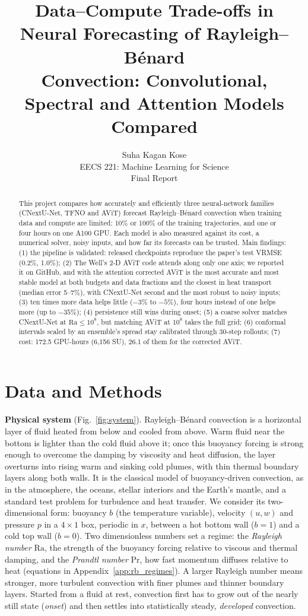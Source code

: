 \documentclass[11pt]{article}
\title{Data--Compute Trade-offs in Neural Forecasting of Rayleigh--B\'enard \\
  Convection: Convolutional, Spectral and Attention Models Compared}
\author{Suha Kagan Kose \\
  EECS 221: Machine Learning for Science \\
  Final Report}
\begin{document}
\maketitle

\begin{abstract}
This project compares how accurately and efficiently three neural-network families (CNextU-Net, TFNO and AViT)
forecast Rayleigh--B\'enard convection when training data and compute are limited: 10\% or 100\% of the training
trajectories, and one or four hours on one A100 GPU. Each model is also measured against its cost, a numerical
solver, noisy inputs, and how far its forecasts can be trusted. Main findings: (1) the pipeline is validated:
released checkpoints reproduce the paper's test VRMSE (0.2\%, 1.0\%); (2) The Well's 2-D AViT code attends along only
one axis; we reported it on GitHub, and with the attention corrected AViT is the most accurate and most stable model
at both budgets and data fractions and the closest in heat transport (median error 5--7\%), with CNextU-Net second
and the most robust to noisy inputs; (3) ten times more data helps little ($-3$\% to $-5$\%), four hours instead of
one helps more (up to $-35$\%); (4) persistence still wins during onset; (5) a coarse solver matches CNextU-Net at
$\mathrm{Ra}\le10^8$, but matching AViT at $10^8$ takes the full grid; (6) conformal intervals scaled by an
ensemble's spread stay calibrated through 30-step rollouts; (7) cost: 172.5 GPU-hours (6,156 SU), 26.1 of them for
the corrected AViT.
\end{abstract}

\section{Data and Methods}
\label{sec:setup}

\textbf{Physical system} (Fig.~\ref{fig:system}). Rayleigh--B\'enard convection is a horizontal layer of fluid
heated from below and cooled from above. Warm fluid near the bottom is lighter than the cold fluid above it; once
this buoyancy forcing is strong enough to overcome the damping by viscosity and heat diffusion, the layer overturns
into rising warm and sinking cold plumes, with thin thermal boundary layers along both walls. It is the classical
model of buoyancy-driven convection, as in the atmosphere, the oceans, stellar interiors and the Earth's mantle,
and a standard test problem for turbulence and heat transfer. We consider its two-dimensional form: buoyancy $b$
(the temperature variable), velocity $(u, w)$ and pressure $p$ in a $4\times1$ box, periodic in $x$, between a hot
bottom wall ($b=1$) and a cold top wall ($b=0$). Two dimensionless numbers set a regime: the \emph{Rayleigh number}
$\mathrm{Ra}$, the strength of the buoyancy forcing relative to viscous and thermal damping, and the
\emph{Prandtl number} $\mathrm{Pr}$, how fast momentum diffuses relative to heat (equations in
Appendix~\ref{app:rb_regimes}). A larger Rayleigh number means stronger, more turbulent convection with finer plumes
and thinner boundary layers. Started from a fluid at rest, convection first has to grow out of the nearly still state
(\emph{onset}) and then settles into statistically steady, \emph{developed} convection.
\end{document}
